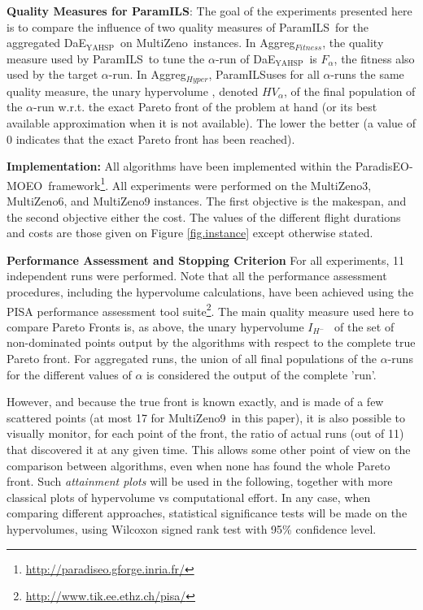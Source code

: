 \documentclass{llncs}
\newcommand{\DAEYAHSP}{{\sc DaE$_{\text{YAHSP}}$}}
\def\PARADISEO{{\sc ParadisEO-MOEO}}
\def\MULTIZENO{{\sc MultiZeno}}
\def\PARAMILS{{\sc ParamILS}}
\def\AGGREGHYPER{{Aggreg$_{Hyper}$}}
\def\AGGREGFITNESS{{Aggreg$_{Fitness}$}}
\renewcommand{\paragraph}[1]{{\bf #1}}
\begin{document}
\paragraph{Quality Measures for \PARAMILS}: The goal of the experiments presented here is to compare the influence of two quality measures of \PARAMILS\ for the aggregated \DAEYAHSP\ on \MULTIZENO\ instances. In \AGGREGFITNESS, the quality measure used by \PARAMILS\ to tune the $\alpha$-run of \DAEYAHSP\ is $F_{\alpha}$, the fitness also used by the target $\alpha$-run. In \AGGREGHYPER, \PARAMILS uses for all $\alpha$-runs the same quality measure, the unary hypervolume \cite{Zitzler2004}, denoted $HV_{\alpha}$, of the final population of the $\alpha$-run w.r.t. the exact Pareto front of the problem at hand (or its best available approximation when it is not available). The lower the better (a value of 0 indicates that the exact Pareto front has been reached). 


\paragraph{Implementation:} All algorithms have been implemented within the \PARADISEO\ framework\footnote{\url{http://paradiseo.gforge.inria.fr/}}. All experiments were performed on the \MULTIZENO3,  \MULTIZENO6, and  \MULTIZENO9 instances. The first objective is the makespan, and the second objective either the cost. The values of the different flight durations and costs are those given on Figure \ref{fig.instance} except otherwise stated.


\paragraph{Performance Assessment and Stopping Criterion} 
For all experiments, 11 independent runs were performed. Note that all the performance assessment procedures, including the hypervolume calculations, have been achieved using the PISA performance assessment tool suite\footnote{\url{http://www.tik.ee.ethz.ch/pisa/}}.
The main quality measure used here to compare Pareto Fronts is, as above, the unary hypervolume  $I_{H^-}$~\cite{Zitzler2004} of the set of non-dominated points output by the algorithms with respect to the complete true Pareto front. For aggregated runs, the union of all final populations of the $\alpha$-runs for the different values of $\alpha$ is considered the output of the complete 'run'.

However, and because the true front is known exactly, and is made of a few scattered points (at most 17 for \MULTIZENO9\ in this paper), it is also possible to visually monitor, for each point of the front, the ratio of actual runs (out of 11) that discovered it at any given time. This allows some other point of view on the comparison between algorithms, even when none has found the whole Pareto front. Such {\em attainment plots} will be used in the following, together with more classical plots of hypervolume vs computational effort. In any case, when comparing different approaches, statistical significance tests will be made on the hypervolumes, using Wilcoxon signed rank test with 95\% confidence level.
\end{document}
